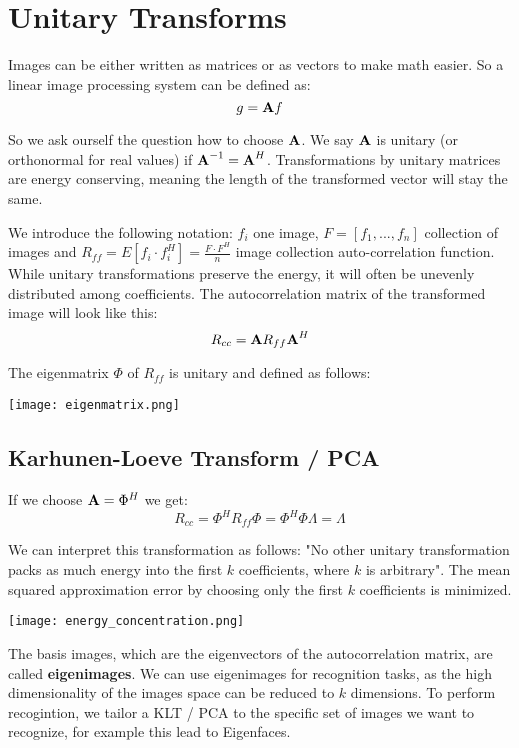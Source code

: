 \section{Unitary Transforms}

Images can be either written as matrices or as vectors to make math easier. So a linear image processing system can be defined as:
$$g = \textbf A f$$

So we ask ourself the question how to choose $\textbf A$. We say $\textbf A$ is unitary (or orthonormal for real values) if $\textbf A^{-1} = \textbf A^H$. Transformations by unitary matrices are energy conserving, meaning the length of the transformed vector will stay the same.

We introduce the following notation: $f_i$ one image, $F = [f_1, ..., f_n]$ collection of images and $R_{ff} = E[f_i \cdot f_i^H] = \frac{F \cdot F^H}{n}$ image collection auto-correlation function. While unitary transformations preserve the energy, it will often be unevenly distributed among coefficients. The autocorrelation matrix of the transformed image will look like this: 
$$R_{cc} = \textbf A R_{ff} \textbf A^H$$

The eigenmatrix $\Phi$ of $R_{ff}$ is unitary and defined as follows:
\begin{center}
	\texttt{[image: eigenmatrix.png]}
\end{center}

\subsection{Karhunen-Loeve Transform / PCA}

If we choose $\textbf A = \Phi^H$ we get:
$$R_{cc} = \Phi^H R_{ff} \Phi = \Phi^H \Phi \Lambda = \Lambda$$

We can interpret this transformation as follows: "No other unitary transformation packs as much energy into the first $k$ coefficients, where $k$ is arbitrary". The mean squared approximation error by choosing only the first $k$ coefficients is minimized. 
\begin{center}
	\texttt{[image: energy\_concentration.png]}
\end{center}

The basis images, which are the eigenvectors of the autocorrelation matrix, are called \textbf{eigenimages}. We can use eigenimages for recognition tasks, as the high dimensionality of the images space can be reduced to $k$ dimensions. To perform recogintion, we tailor a KLT / PCA to the specific set of images we want to recognize, for example this lead to Eigenfaces.

